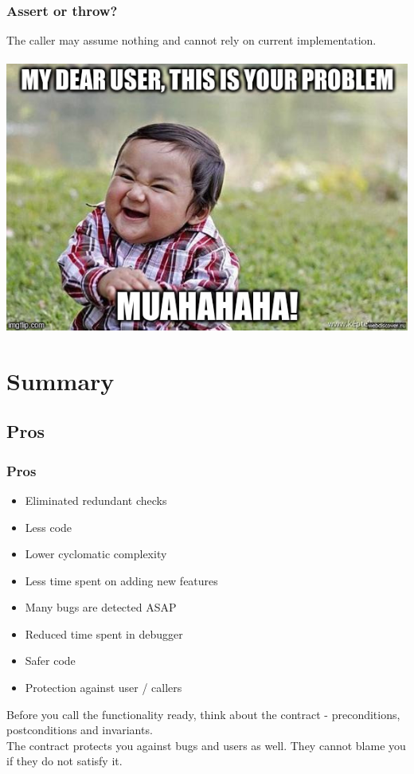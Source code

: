 \documentclass{beamer}
\begin{document}
\begin{frame}[fragile]
\frametitle{Assert or throw?}
\begin{center}
The caller may assume nothing and cannot rely on current implementation. \\~\\
\includegraphics[scale=0.4]{evil_genius}
\end{center}
\end{frame}



\section{Summary}
\begin{frame}
\sectionpage
\end{frame}

\subsection{Pros}
\begin{frame}
\frametitle{Pros}
\begin{itemize}
  \item Eliminated redundant checks
  \item Less code
  \item Lower cyclomatic complexity
  \item Less time spent on adding new features
  \item Many bugs are detected ASAP
  \item Reduced time spent in debugger
  \item Safer code
  \item Protection against user / callers
\end{itemize}
Before you call the functionality ready, think about the contract - preconditions, postconditions and invariants. \\
The contract protects you against bugs and users as well. They cannot blame you if they do not satisfy it.
\end{frame}
\end{document}
